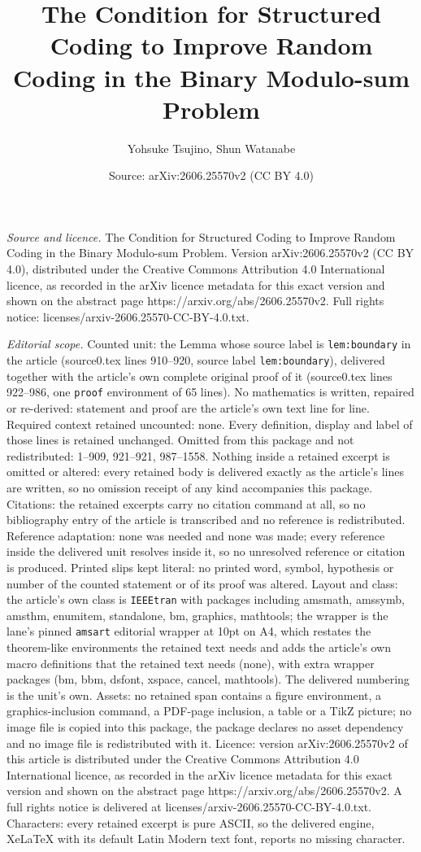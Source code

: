 \documentclass[10pt,a4paper]{amsart}
\title[The Condition for Structured Coding to Improve Random Coding]{The Condition for Structured Coding to Improve Random Coding in the Binary Modulo-sum Problem}
\author{Yohsuke Tsujino, Shun Watanabe}
\date{Source: arXiv:2606.25570v2 (CC BY 4.0)}
\begin{document}
\maketitle

\noindent\emph{Source and licence.} The Condition for Structured Coding to Improve Random Coding in the Binary Modulo-sum Problem. Version arXiv:2606.25570v2 (CC BY 4.0), distributed under the Creative Commons Attribution 4.0 International licence, as recorded in the arXiv licence metadata for this exact version and shown on the abstract page https://arxiv.org/abs/2606.25570v2. Full rights notice: licenses/arxiv-2606.25570-CC-BY-4.0.txt.\par\smallskip

\noindent\textit{Editorial scope.} Counted unit: the Lemma whose source label is \texttt{lem:boundary} in the article (source0.tex lines 910--920, source label \texttt{lem:boundary}), delivered together with the article's own complete original proof of it (source0.tex lines 922--986, one \texttt{proof} environment of 65 lines). No mathematics is written, repaired or re-derived: statement and proof are the article's own text line for line. Required context retained uncounted: none. Every definition, display and label of those lines is retained unchanged. Omitted from this package and not redistributed: 1--909, 921--921, 987--1558. Nothing inside a retained excerpt is omitted or altered: every retained body is delivered exactly as the article's lines are written, so no omission receipt of any kind accompanies this package. Citations: the retained excerpts carry no citation command at all, so no bibliography entry of the article is transcribed and no reference is redistributed. Reference adaptation: none was needed and none was made; every reference inside the delivered unit resolves inside it, so no unresolved reference or citation is produced. Printed slips kept literal: no printed word, symbol, hypothesis or number of the counted statement or of its proof was altered. Layout and class: the article's own class is \texttt{IEEEtran} with packages including amsmath, amssymb, amsthm, enumitem, standalone, bm, graphics, mathtools; the wrapper is the lane's pinned \texttt{amsart} editorial wrapper at 10pt on A4, which restates the theorem-like environments the retained text needs and adds the article's own macro definitions that the retained text needs (none), with extra wrapper packages (bm, bbm, dsfont, xspace, cancel, mathtools). The delivered numbering is the unit's own. Assets: no retained span contains a figure environment, a graphics-inclusion command, a PDF-page inclusion, a table or a TikZ picture; no image file is copied into this package, the package declares no asset dependency and no image file is redistributed with it. Licence: version arXiv:2606.25570v2 of this article is distributed under the Creative Commons Attribution 4.0 International licence, as recorded in the arXiv licence metadata for this exact version and shown on the abstract page https://arxiv.org/abs/2606.25570v2. A full rights notice is delivered at licenses/arxiv-2606.25570-CC-BY-4.0.txt. Characters: every retained excerpt is pure ASCII, so the delivered engine, XeLaTeX with its default Latin Modern text font, reports no missing character.
\end{document}
